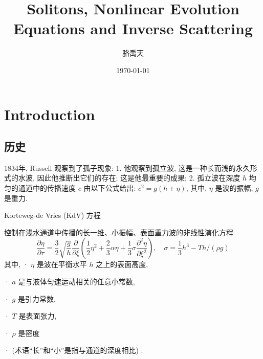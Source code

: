 \documentclass[14pt,a4paper,oneside]{article}
\title{\textbf{Solitons, Nonlinear Evolution Equations and Inverse Scattering}}                           %
\author{骆禹天}                                           %
\date{\today}                                        %
\numberwithin{equation}{subsection}             %
\begin{document}

\maketitle

\setcounter{page}{1}          %




\tableofcontents              %

\newpage
\setcounter{page}{1}          %






\section{Introduction}

\subsection{历史}

1834年, Russell 观察到了孤子现象:
1. 他观察到孤立波, 这是一种长而浅的永久形式的水波, 因此他推断出它们的存在; 这是他最重要的成果;  
2. 孤立波在深度 $h$ 均匀的通道中的传播速度 $c$ 由以下公式给出: $c^2 = g(h +\eta )$, 其中, $\eta$ 是波的振幅, $g$ 是重力. 


Korteweg-de Vries (KdV) 方程

控制在浅水通道中传播的长一维、小振幅、表面重力波的非线性演化方程
\begin{equation}
   \frac{\partial\eta}{\partial\tau}=\frac32\sqrt{\frac gh}\frac\partial{\partial\xi}\left(\frac12\eta^2+\frac23\alpha\eta+\frac13\sigma\frac{\partial^2\eta}{\partial\xi^2}\right),\quad\sigma=\frac13h^3-Th/(\rho g)
   \label{eq:1.1.1}
\end{equation}
其中,
· $\eta$ 是波在平衡水平 $h$ 之上的表面高度, 

· $a$ 是与液体匀速运动相关的任意小常数, 

· $g$ 是引力常数, 

· $T$ 是表面张力, 

· $\rho$ 是密度

·  (术语“长”和“小”是指与通道的深度相比) . 
\end{document}
